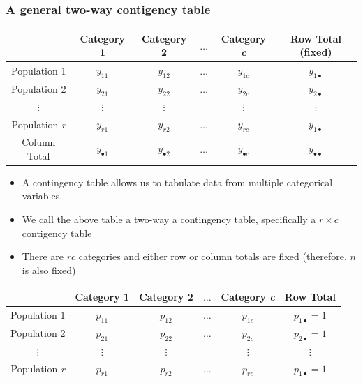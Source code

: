 \documentclass[a4paper]{article}\usepackage[]{graphicx}\usepackage[]{xcolor}
\begin{document}
\subsubsection{A general two-way contigency table}
\begin{table}[H]
	\centering
	\begin{tabular}{@{}cccccc@{}}
	\toprule
				 		  & Category 1   		& Category 2   		  & \( \dots \) & Category \textit{c} & Row Total (fixed)        \\ \midrule
	Population 1 		  & \( y_{11} \) 		& \( y_{12} \) 		  & \( \dots \) & \( y_{1c} \)        & \( y_{1 \bullet} \)      \\
	Population 2 		  & \( y_{21} \) 		& \( y_{22} \) 		  & \( \dots \) & \( y_{2c} \)        & \( y_{2 \bullet} \)      \\ 
	\( \vdots \) 		  & \( \vdots \) 		& \( \vdots \) 		  &             & \( \vdots \)        & \( \vdots \) 	         \\ 
	Population \textit{r} & \( y_{r1} \) 		& \( y_{r2} \) 		  & \( \dots \) & \( y_{rc} \)        & \( y_{1 \bullet} \)      \\ \midrule
	Column Total 		  & \( y_{\bullet 1} \) & \( y_{\bullet 2} \) & \( \dots \) & \( y_{\bullet c} \) & \( y_{\bullet\bullet} \) \\ \bottomrule
	\end{tabular}
\end{table}
\begin{itemize}
	\item A contingency table allows us to tabulate data from multiple categorical variables.
	\item We call the above table a two-way a contingency table, specifically a \( r \times c \) contigency table
	\item There are \( rc \) categories and either row or column totals are fixed (therefore, \( n \) is also fixed)
\end{itemize}
\begin{table}[H]
	\centering
	\begin{tabular}{@{}cccccc@{}}
	\toprule
				 		  & Category 1   					& Category 2   		  				& \( \dots \) & Category \textit{c}				  & Row Total               \\ \midrule
	Population 1 		  & \textcolor{myred}{\( p_{11} \)} & \textcolor{mygreen}{\( p_{12} \) }	& \( \dots \) & \textcolor{mygreen}{\( p_{1c} \)} & \( p_{1 \bullet} = 1 \) \\
	Population 2 		  & \textcolor{myred}{\( p_{21} \)} & \textcolor{mygreen}{\( p_{22} \) }	& \( \dots \) & \textcolor{mygreen}{\( p_{2c} \)} & \( p_{2 \bullet} = 1 \) \\ 
	\( \vdots \) 		  & \( \vdots \) 					& \( \vdots \) 		  				&             & \( \vdots \)        			  & \( \vdots \) 	        \\ 
	Population \textit{r} & \textcolor{myred}{\( p_{r1} \)} & \textcolor{mygreen}{\( p_{r2} \)} 	& \( \dots \) & \textcolor{mygreen}{\( p_{rc} \)} & \( p_{1 \bullet} = 1 \) \\ \bottomrule
	\end{tabular}
\end{table}
\end{document}

